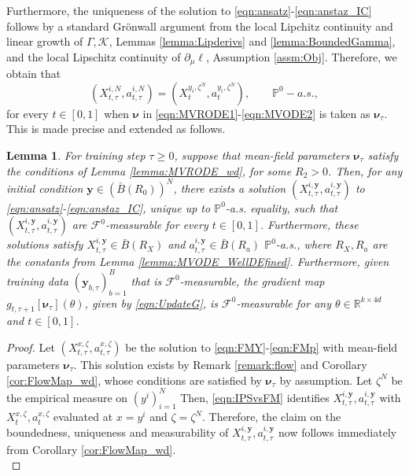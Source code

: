 \documentclass{article}
\newtheorem{lemma}[theorem]{Lemma}
\newcommand{\R}{\mathbb{R}}
\begin{document}
\begin{appendices}
 Furthermore, the uniqueness of the solution to \eqref{eqn:ansatz}-\eqref{eqn:anstaz_IC} follows by a standard Gr\"onwall argument from the local Lipchitz continuity and linear growth of $\Gamma,\mathcal K$, Lemmas \ref{lemma:Lipderivs} and \ref{lemma:BoundedGamma}, and the local Lipschitz continuity of $\partial_\mu\ell$, Assumption \ref{assm:Obj}. Therefore, we obtain that
\begin{equation}\label{eqn:IPSvsFM}
\left(X^{i,N}_{t,\tau},a^{i,N}_{t,\tau}\right) = \left(X^{y_i,\zeta^N}_{t}, a^{y_i,\zeta^N}_t \right), \qquad \mathbb P^0-a.s.,
\end{equation}
for every $t\in[0,1]$ when $\bm{\nu}$ in \eqref{eqn:MVRODE1}-\eqref{eqn:MVODE2} is taken as $\bm{\nu}_\tau$.\\

This is made precise and extended as follows.
\begin{lemma}\label{lemma:InductiveStep}
    For training step $\tau \ge 0$, suppose that mean-field parameters $\bm{\nu}_\tau$ satisfy the conditions of Lemma \ref{lemma:MVRODE_wd}, for some $R_2>0$. Then, for any initial condition $\bm{y}\in (\bar B(R_0))^N$, there exists a solution $(X^{i,\bm{y}}_{t,\tau},a^{i,\bm{y}}_{t,\tau})$ to \eqref{eqn:ansatz}-\eqref{eqn:anstaz_IC}, unique up to $\mathbb P^0$-a.s. equality, such that $(X^{i,\bm{y}}_{t,\tau},a^{i,\bm{y}}_{t,\tau})$ are $\mathcal F^0$-measurable for every $t\in[0,1]$. Furthermore, these solutions satisfy
    $X^{i,\bm{y}}_{t,\tau}\in\bar B(R_X)$ and $a^{i,\bm{y}}_{t,\tau}\in \bar B(R_a)$ $\mathbb P^0$-a.s., where $R_X,R_a$ are the constants from Lemma \ref{lemma:MVODE_WellDEfined}. Furthermore, given training data $(\bm{y}_{b,\tau})_{b=1}^B$ that is $\mathcal F^0$-measurable, the gradient map $g_{t,\tau+1}[\bm\nu_\tau](\theta)$, given by \eqref{eqn:UpdateG}, is $\mathcal F^0$-measurable for any $\theta \in \R^{k\times 4d}$ and $t\in[0,1]$.
\end{lemma}
\begin{proof}
Let $(X_{t,\tau}^{x,\zeta},a^{x,\zeta}_{t,\tau})$ be the solution to \eqref{eqn:FMY}-\eqref{eqn:FMp} with mean-field parameters $\bm\nu_\tau$. This solution exists by Remark \ref{remark:flow} and Corollary \ref{cor:FlowMap_wd}, whose conditions are satisfied by $\bm\nu_\tau$ by assumption. 
Let $\zeta^N$ be the empirical measure on $(y^i)_{i=1}^N$
Then, \eqref{eqn:IPSvsFM} identifies $X^{i,\bm{y}}_{t,\tau},a^{i,\bm{y}}_{t,\tau}$ with $X_t^{x,\zeta},a^{x,\zeta}_t$ evaluated at $x=y^i$ and $\zeta=\zeta^N$. Therefore, the claim on the boundedness, uniqueness and measurability of $X^{i,\bm{y}}_{t,\tau},a^{i,\bm{y}}_{t,\tau}$ now follows immediately from Corollary \ref{cor:FlowMap_wd}. \\


\end{proof}
\end{appendices}
\end{document}
